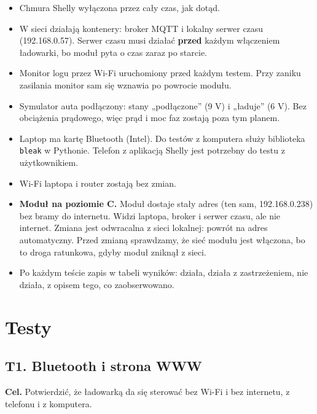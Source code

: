 \documentclass[11pt,a4paper]{article}
\begin{document}
\begin{itemize}
\item Chmura Shelly wyłączona przez cały czas, jak dotąd.
\item W sieci działają kontenery: broker MQTT i lokalny serwer czasu (192.168.0.57). Serwer czasu musi działać \textbf{przed} każdym włączeniem ładowarki, bo moduł pyta o czas zaraz po starcie.
\item Monitor logu przez Wi-Fi uruchomiony przed każdym testem. Przy zaniku zasilania monitor sam się wznawia po powrocie modułu.
\item Symulator auta podłączony: stany „podłączone” (9 V) i „ładuje” (6 V). Bez obciążenia prądowego, więc prąd i moc faz zostają poza tym planem.
\item Laptop ma kartę Bluetooth (Intel). Do testów z komputera służy biblioteka \texttt{bleak} w Pythonie. Telefon z aplikacją Shelly jest potrzebny do testu z użytkownikiem.
\item Wi-Fi laptopa i router zostają bez zmian.
\item \textbf{Moduł na poziomie C.} Moduł dostaje stały adres (ten sam, 192.168.0.238) bez bramy do internetu. Widzi laptopa, broker i serwer czasu, ale nie internet. Zmiana jest odwracalna z sieci lokalnej: powrót na adres automatyczny. Przed zmianą sprawdzamy, że sieć modułu jest włączona, bo to droga ratunkowa, gdyby moduł zniknął z sieci.
\item Po każdym teście zapis w tabeli wyników:  działa,  działa z zastrzeżeniem,  nie działa, z opisem tego, co zaobserwowano.
\end{itemize}

\section{Testy}

\subsection{T1. Bluetooth i strona WWW}

\textbf{Cel.} Potwierdzić, że ładowarką da się sterować bez Wi-Fi i bez internetu, z telefonu i z komputera.
\end{document}
